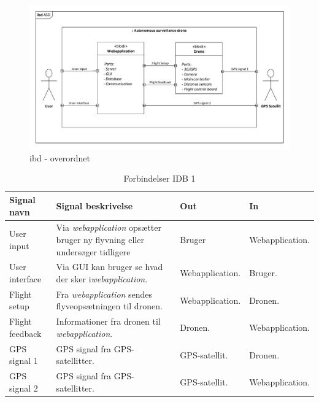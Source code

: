 

\begin{figure}[H]
\centering
\includegraphics[width=1\textwidth]{Billeder/IBD/ibd1_overordnet.pdf}
\caption{ibd - overordnet}
\label{fig:ibd_overordnet}
\end{figure}

\begin{table}[H]
	\centering
		\begin{tabular}{|p{2.5 cm}|p{5.5 cm}|p{2.5 cm}|p{2.5 cm}|} 
		\hline
			\textbf{Signal navn} 	& \textbf{Signal beskrivelse}		& \textbf{Out} 				& \textbf{In}     \\ \hline
			User input 			& Via \textit{webapplication} opsætter bruger ny flyvning eller undersøger tidligere & Bruger 		& Webapplication.			    \\ \hline
			User interface 		& Via GUI kan bruger se hvad der sker i\textit{webapplication}.	& Webapplication.			& Bruger.				\\ \hline
			Flight setup		& Fra \textit{webapplication} sendes flyveopsætningen til dronen.	& Webapplication.	& Dronen.	\\ \hline
			Flight feedback		& Informationer fra dronen til \textit{webapplication}.	& 	Dronen.		& Webapplication.			    \\ \hline
			GPS signal 1		& GPS signal fra GPS-satellitter.	& GPS-satellit.			& Dronen.				\\ \hline
			GPS signal 2		& GPS signal fra GPS-satellitter.	& GPS-satellit.				& Webapplication.	\\ \hline  
		\end{tabular}
	\caption{Forbindelser IDB 1}
	\label{tab:IDB1}
\end{table}

